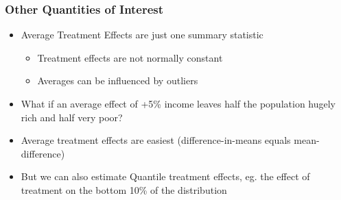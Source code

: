 \documentclass[xcolor=x11names,compress]{beamer}\usepackage[]{graphicx}\usepackage[]{color}
\renewcommand{\(}{\begin{columns}}
\renewcommand{\)}{\end{columns}}
\newcommand{\<}[1]{\begin{column}{#1}}
\renewcommand{\>}{\end{column}}
\begin{document}
\begin{frame}
\frametitle{Other Quantities of Interest}
\begin{itemize}
\item Average Treatment Effects are just one summary statistic
\begin{itemize}
\item Treatment effects are not normally constant
\pause
\item Averages can be influenced by outliers
\end{itemize}
\pause
\item What if an average effect of +5\% income leaves half the population hugely rich and half very poor?
\pause
\item Average treatment effects are easiest (difference-in-means equals mean-difference)
\pause
\item But we can also estimate Quantile treatment effects, eg. the effect of treatment on the bottom 10\% of the distribution
\end{itemize}
\end{frame}
\end{document}
